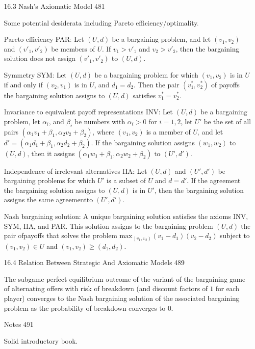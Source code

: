 16.3 Nash's Axiomatic Model 481

Some potential desiderata including Pareto efficiency/optimality.

Pareto efficiency PAR: Let $(U,d)$ be a bargaining problem, and let $(v_1,v_2)$ and $(v'_1,v'_2)$ be members of $U$. If $v_1>v'_1$ and $v_2>v'_2$, then the bargaining solution does not assign $(v'_1,v'_2)$ to $(U,d)$.

Symmetry SYM: Let $(U,d)$ be a bargaining problem for which $(v_1,v_2)$ is in $U$ if and only if $(v_2,v_1)$ is in $U$, and $d_1=d_2$. Then the pair $(v^{*}_1,v^{*}_2)$ of payoffs the bargaining solution assigns to $(U,d)$ satisfies $v^{*}_1=v^{*}_2$.

Invariance to equivalent payoff representations INV: Let $(U,d)$ be a bargaining problem, let $\alpha_i$, and $\beta_i$ be numbers with $\alpha_i>0$ for $i=1,2$, let $U'$ be the set of all pairs $(\alpha_1 v_1+\beta_1,\alpha_2 v_2 + \beta_2)$, where $(v_1,v_2)$ is a member of $U$, and let $d'=(\alpha_1 d_1+\beta_1,\alpha_2 d_2+\beta_2)$. If the bargaining solution assigns $(w_1,w_2)$ to $(U,d)$, then it assigns $(\alpha_1 w_1+\beta_1,\alpha_2 w_2+\beta_2)$ to $(U',d')$.

Independence of irrelevant alternatives IIA: Let $(U,d)$ and $(U',d')$ be bargaining problems for which $U'$ is a subset of $U$ and $d=d'$. If the agreement the bargaining solution assigns to $(U,d)$ is in $U'$, then the bargaining solution assigns the same agreementto $(U',d')$.

Nash bargaining solution: A unique bargaining solution satisfies the axioms INV, SYM, IIA, and PAR. This solution assigns to the bargaining problem $(U,d)$ the pair ofpayoffs that solves the problem $\text{max}_{(v_1,v_2)}(v_1-d_1)(v_2-d_2)$ subject to $(v_1,v_2) \in U$ and $(v_1,v_2)\ge (d_1,d_2)$.

16.4 Relation Between Strategic And Axiomatic Models 489

The subgame perfect equilibrium outcome of the variant of the bargaining game of alternating offers with risk of breakdown (and discount factors of $1$ for each player) converges to the Nash bargaining solution of the associated bargaining problem as the probability of breakdown converges to $0$.

Notes 491

Solid introductory book.